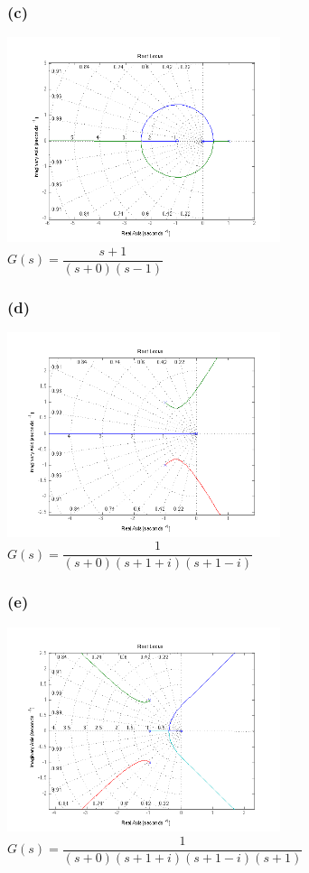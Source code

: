 \documentclass[letterpaper,10pt]{article}
\begin{document}
\subsubsection*{(c)}
\begin{center}
    \includegraphics[width=0.6\textwidth]{homework04-7-1-c.png} \\
   $G(s) = \dfrac{s+1}{(s+0)(s-1)}$
\end{center}
\subsubsection*{(d)}
\begin{center}
    \includegraphics[width=0.6\textwidth]{homework04-7-1-d.png} \\
   $G(s) = \dfrac{1}{(s+0)(s+1+i)(s+1-i)}$
\end{center}
\subsubsection*{(e)}
\begin{center}
    \includegraphics[width=0.6\textwidth]{homework04-7-1-e.png} \\
   $G(s) = \dfrac{1}{(s+0)(s+1+i)(s+1-i)(s+1)}$
\end{center}
\end{document}
